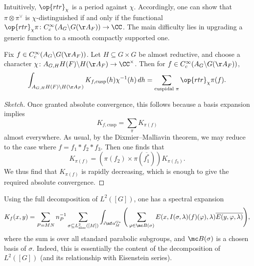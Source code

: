 \documentclass{article}
\begin{document}
\begin{remark}
	Intuitively, $\op{rtr}_\chi$ is a period against $\chi$. Accordingly, one can show that $\pi\otimes\pi^\lor$ is $\chi$-distin\-guished if and only if the functional $\op{rtr}_\chi\pi\colon C_c^\infty(A_G\backslash G(\AA_F))\to\CC$. The main difficulty lies in upgrading a generic function to a smooth compactly supported one.
\end{remark}
\begin{theorem}
	Fix $f\in C_c^\infty(A_G\backslash G(\AA_F))$. Let $H\subseteq G\times G$ be almost reductive, and choose a character $\chi\colon A_{G,H}H(F)\backslash H(\AA_F)\to\CC^\times$. Then for $f\in C_c^\infty(A_G\backslash G(\AA_F))$,
	\[\int_{A_{G,H}H(F)\backslash H(\AA_F)}K_{f,\mathrm{cusp}}(h)\chi^{-1}(h)\,dh=\sum_{\text{cuspidal }\pi}\op{rtr}_\chi\pi(f).\]
\end{theorem}
\begin{proof}[Sketch]
	Once granted absolute convergence, this follows because a basis expansion implies
	\[K_{f,\mathrm{cusp}}=\sum_\pi K_{\pi(f)}\]
	almost everywhere. As usual, by the Dixmier--Malliavin theorem, we may reduce to the case where $f=f_1*f_2*f_3$. Then one finds that
	\[K_{\pi(f)}=(\pi(f_2)\times\pi(\overline {f_1^*}))K_{\pi(f_3)}.\]
	We thus find that $K_{\pi(f)}$ is rapidly decreasing, which is enough to give the required absolute convergence.
\end{proof}
\begin{remark}
	Using the full decomposition of $L^2([G])$, one has a spectral expansion
	\[K_f(x,y)=\sum_{P=MN}n_P^{-1}\sum_{\sigma\subseteq L^2_{\mathrm{disc}}([M])}\int_{i\mf a^{G*}_M}\Bigg(\sum_{\varphi\in\mc B(\sigma)}E(x,I(\sigma,\lambda)(f)(\varphi),\lambda)\overline{E(y,\varphi,\lambda)}\Bigg),\]
	where the sum is over all standard parabolic subgroups, and $\mc B(\sigma)$ is a chosen basis of $\sigma$. Indeed, this is essentially the content of the decomposition of $L^2([G])$ (and its relationship with Eisenstein series).
\end{remark}
\end{document}
